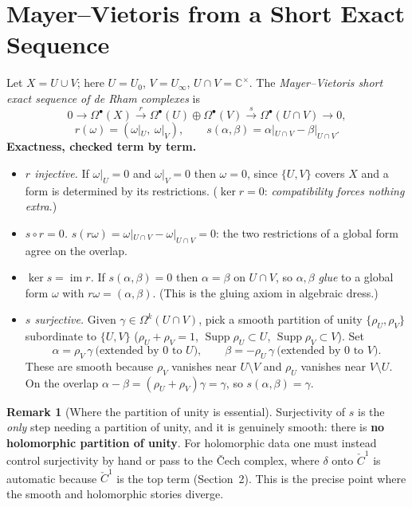 \documentclass[11pt]{article}
\newcommand{\CC}{\mathbb C}
\newcommand{\CCech}{\check C}
\newcommand{\im}{\operatorname{im}}
\newcommand{\kerop}{\operatorname{ker}}
\newcommand{\Supp}{\operatorname{Supp}}
\theoremstyle{plain}
\theoremstyle{definition}
\newtheorem{remark}{Remark}
\begin{document}
\section{Mayer--Vietoris from a Short Exact Sequence}
Let $X=U\cup V$; here $U=U_0$, $V=U_\infty$, $U\cap V=\CC^\times$. The
\emph{Mayer--Vietoris short exact sequence of de Rham complexes} is
\[
  0\longrightarrow \Omega^\bullet(X)\xrightarrow{\,r\,}
  \Omega^\bullet(U)\oplus\Omega^\bullet(V)\xrightarrow{\,s\,}
  \Omega^\bullet(U\cap V)\longrightarrow 0,
\]
\[
  r(\omega)=(\omega|_U,\ \omega|_V),
  \qquad
  s(\alpha,\beta)=\alpha|_{U\cap V}-\beta|_{U\cap V}.
\]
\textbf{Exactness, checked term by term.}
\begin{itemize}
  \item \emph{$r$ injective.} If $\omega|_U=0$ and $\omega|_V=0$ then $\omega=0$,
        since $\{U,V\}$ covers $X$ and a form is determined by its restrictions.
        ($\kerop r=0$: \emph{compatibility forces nothing extra}.)
  \item \emph{$s\circ r=0$.} $s(r\omega)=\omega|_{U\cap V}-\omega|_{U\cap V}=0$:
        the two restrictions of a global form agree on the overlap.
  \item \emph{$\kerop s=\im r$.} If $s(\alpha,\beta)=0$ then $\alpha=\beta$ on
        $U\cap V$, so $\alpha,\beta$ \emph{glue} to a global form $\omega$ with
        $r\omega=(\alpha,\beta)$. (This is the gluing axiom in algebraic dress.)
  \item \emph{$s$ surjective.} Given $\gamma\in\Omega^k(U\cap V)$, pick a smooth
        partition of unity $\{\rho_U,\rho_V\}$ subordinate to $\{U,V\}$
        ($\rho_U+\rho_V=1$, $\Supp\rho_U\subset U$, $\Supp\rho_V\subset V$). Set
        \[
          \alpha=\rho_V\,\gamma\ \text{(extended by $0$ to }U),\qquad
          \beta=-\rho_U\,\gamma\ \text{(extended by $0$ to }V).
        \]
        These are smooth because $\rho_V$ vanishes near $U\setminus V$ and
        $\rho_U$ vanishes near $V\setminus U$. On the overlap
        $\alpha-\beta=(\rho_U+\rho_V)\gamma=\gamma$, so $s(\alpha,\beta)=\gamma$.
\end{itemize}
\begin{remark}[Where the partition of unity is essential]
Surjectivity of $s$ is the \emph{only} step needing a partition of unity, and it
is genuinely smooth: there is \textbf{no holomorphic partition of unity}. For
holomorphic data one must instead control surjectivity by hand or pass to the
\v Cech complex, where $\delta$ onto $\CCech^1$ is automatic because $\CCech^1$ is
the top term (Section~2). This is the precise point where the smooth and
holomorphic stories diverge.
\end{remark}
\end{document}
